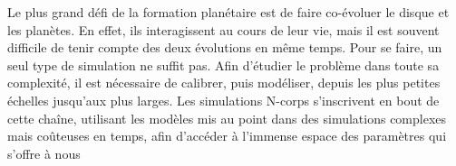 Le plus grand défi de la formation planétaire est de faire co-évoluer le disque et les planètes. En effet, ils interagissent au cours de leur vie, mais il est souvent difficile de tenir compte des deux évolutions en même temps. Pour se faire, un seul type de simulation ne suffit pas. Afin d'étudier le problème dans toute sa complexité, il est nécessaire de calibrer, puis modéliser, depuis les plus petites échelles jusqu'aux plus larges. Les simulations N-corps s'inscrivent en bout de cette chaîne, utilisant les modèles mis au point dans des simulations complexes mais coûteuses en temps, afin d'accéder à l'immense espace des paramètres qui s'offre à nous
